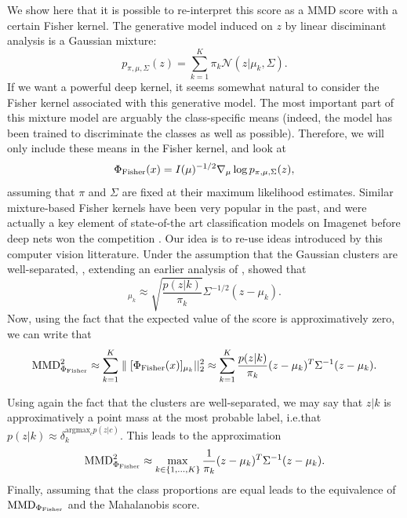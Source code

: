 {We show here that it is possible to re-interpret this score as a MMD score with a certain Fisher kernel. 
The generative model induced on $z$ by linear disciminant analysis is a Gaussian mixture:
\begin{equation}
    p_{\pi, \mu , \Sigma }(z) = \sum_{k=1}^K \pi_k \mathcal{N}(z | \mu_k, \Sigma).
\end{equation}
If we want a powerful deep kernel, it seems somewhat natural to consider the Fisher kernel associated with this generative model. The most important part of this mixture model are arguably the class-specific means (indeed, the model has been trained to discriminate the classes as well as possible). Therefore, we will only include these means in the Fisher kernel, and look at
\begin{equation}
	\Phi_\textup{Fisher} (x) = I(\mu)^{-1/2} \nabla_\mu  \log p_{\pi, \mu , \Sigma }(z),
\end{equation}
assuming that $\pi$ and $\Sigma$ are fixed at their maximum likelihood estimates. Similar mixture-based Fisher kernels have been very popular in the past, and were actually a key element of state-of-the art classification models on Imagenet before deep nets won the competition \citep{perronnin_improving_2010}. Our idea is to re-use ideas introduced by this computer vision litterature. Under the assumption that the Gaussian clusters are well-separated, \textcite{tanaka_fisher_2013}, extending an earlier analysis of \textcite[Appendix A]{sanchez_image_2013}, showed that
\begin{equation}
	[\Phi_\textup{Fisher} (x)]_{\mu_k} \approx \sqrt{\frac{p(z|k)}{\pi_k }}  \Sigma^{-1/2} (z - \mu_k).
\end{equation}
Now, using the fact that the expected value of the score is approximatively zero, we can write that
\begin{equation}
    \textup{MMD}_{\Phi_\textup{Fisher}}^2 \approx \sum_{k=1}^K  \parallel [\Phi_\textup{Fisher} (x)]_{\mu_k} ||_2^2 \approx \sum_{k=1}^K \frac{p(z|k)}{\pi_k} (z - \mu_k)^T \Sigma^{-1} (z - \mu_k).
\end{equation}



Using again the fact that the clusters are well-separated, we may say that $z|k$ is approximatively a point mass at the most probable label,  i.e.\@ that $p(z|k) \approx \delta_k^{\text{argmax}_c p(z|c)}$. This leads to the approximation 
\begin{equation}
    \textup{MMD}_{\Phi_\textup{Fisher}}^2 \approx \max_{k \in \{1,...,K\}} \frac{1}{\pi_k} (z - \mu_k)^T \Sigma^{-1} (z - \mu_k).
\end{equation}
Finally, assuming that the class proportions are equal leads to the equivalence of $\textup{MMD}_{\Phi_\textup{Fisher}}$ and the Mahalanobis score.




}
